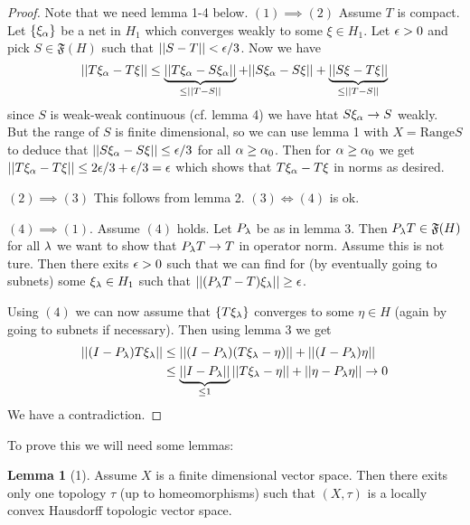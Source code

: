 \documentclass[10pt,english,a4paper]{article}
\theoremstyle{definition}
\newtheorem*{lemma}{Lemma}
\def\Ff{\mathfrak{F}}
\begin{document}
\begin{proof}
    Note that we need lemma 1-4 below. 
    $(1)\implies (2)$ Assume $T$ is compact. Let $\{\xi_{\alpha}\}$ be a net in $H_1$ which 
    converges weakly to some $\xi\in H_1$. Let $\epsilon > 0$ and pick 
    $S \in \Ff(H)$ such that $||S-T|| < \epsilon/3$. Now we have 
\[ ||T\xi_{\alpha} - T\xi || \leq \underbrace{||T\xi_{\alpha} - S\xi_{\alpha}||}_{\leq ||T-S||}
+ ||S\xi_{\alpha} - S\xi|| + \underbrace{||S\xi-T\xi||}_{\leq ||T-S||}\]
since $S$ is weak-weak continuous (cf. lemma 4) we have htat $S\xi_{\alpha}\to S$ 
weakly. But the range of $S$ is finite dimensional, so we can use lemma 1 with 
$X = \text{Range}S$ to deduce that $||S\xi_{\alpha}-S\xi||\leq \epsilon/3$ for all 
$\alpha \geq \alpha_0$. Then for $\alpha \geq \alpha_0$ we get 
$||T\xi_{\alpha} - T\xi|| \leq 2\epsilon/3 + \epsilon/3 = \epsilon$ which shows that 
$T\xi_{\alpha} -T\xi$ in norms as desired.

$(2)\implies (3)$ This follows from lemma 2. $(3) \iff (4)$ is ok. 

$(4) \implies (1)$. Assume $(4)$ holds. 
Let $P_{\lambda}$ be as in lemma 3. Then $P_{\la}T \in \Ff(H)$ for all $\lambda$ 
we want to show that $P_{\lambda}T \to T$ in operator norm. Assume this is not ture. 
Then there exits $\epsilon > 0$ such that we can find for 
(by eventually going to subnets) some $\xi_{\lambda} \in H_1$ such that $||(P_{\lambda}T-T)\xi_{\lambda}||\geq \epsilon$.

Using $(4)$ we can now assume that $\{T\xi_{\lambda}\}$ converges to some $\eta \in H$
(again by going to subnets if necessary). Then using lemma 3 we get 
\begin{align*}
    ||(I-P_{\lambda})T\xi_{\lambda}|| &\leq 
    ||(I-P_{\lambda})(T\xi_{\lambda}-\eta)|| + ||(I-P_{\lambda})\eta|| \\
    &\leq \underbrace{||I-P_{\lambda}||}_{\leq 1} ||T\xi_{\lambda} -\eta|| +
    ||\eta-P_{\lambda}\eta|| \to 0
\end{align*}
We have  a contradiction. 


 
\end{proof}


To prove this we will need some lemmas:
\begin{lemma}[1]
    Assume $X$ is a finite dimensional vector space. Then there exits only one 
    topology $\tau$ (up to homeomorphisms) such that $(X,\tau)$ is a locally 
    convex Hausdorff topologic vector space.
\end{lemma}
\end{document}
